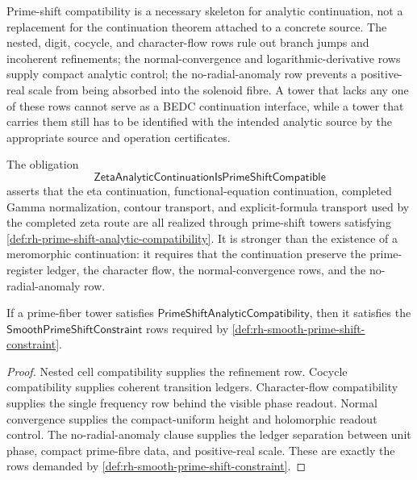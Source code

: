 \begin{principle}
\label{prin:rh-compatibility-continuation-skeleton}
Prime-shift compatibility is a necessary skeleton for analytic
continuation, not a replacement for the continuation theorem attached to
a concrete source. The nested, digit, cocycle, and character-flow rows
rule out branch jumps and incoherent refinements; the normal-convergence
and logarithmic-derivative rows supply compact analytic control; the
no-radial-anomaly row prevents a positive-real scale from being
absorbed into the solenoid fibre. A tower that lacks any one of these
rows cannot serve as a BEDC continuation interface, while a tower that
carries them still has to be identified with the intended analytic
source by the appropriate source and operation certificates.
\end{principle}

\begin{definition}[ZetaAnalyticContinuationIsPrimeShiftCompatible]
\label{def:rh-zeta-analytic-continuation-prime-shift-compatible}
The obligation
$$
\mathsf{ZetaAnalyticContinuationIsPrimeShiftCompatible}
$$
asserts that the eta continuation, functional-equation continuation,
completed Gamma normalization, contour transport, and explicit-formula
transport used by the completed zeta route are all realized through
prime-shift towers satisfying
\autoref{def:rh-prime-shift-analytic-compatibility}. It is stronger than
the existence of a meromorphic continuation: it requires that the
continuation preserve the prime-register ledger, the character flow, the
normal-convergence rows, and the no-radial-anomaly row.
\end{definition}

\begin{theorem}
\label{thm:rh-prime-shift-analytic-compatibility-refines-smooth-shift}
If a prime-fiber tower satisfies
$\mathsf{PrimeShiftAnalyticCompatibility}$, then it satisfies the
$\mathsf{SmoothPrimeShiftConstraint}$ rows required by
\autoref{def:rh-smooth-prime-shift-constraint}.
\end{theorem}

\begin{proof}
Nested cell compatibility supplies the refinement row. Cocycle
compatibility supplies coherent transition ledgers. Character-flow
compatibility supplies the single frequency row behind the visible phase
readout. Normal convergence supplies the compact-uniform height and
holomorphic readout control. The no-radial-anomaly clause supplies the
ledger separation between unit phase, compact prime-fibre data, and
positive-real scale. These are exactly the rows demanded by
\autoref{def:rh-smooth-prime-shift-constraint}.
\end{proof}

